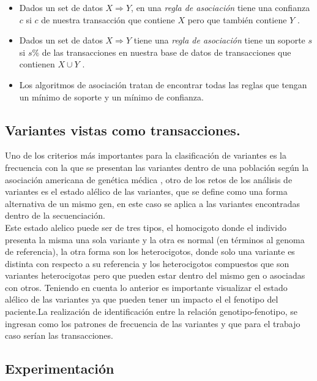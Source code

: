 \begin{itemize}
	\item Dados un set de datos $X \Rightarrow Y$, en una \textit{regla de asociación} tiene una confianza $c$ si $c$ de nuestra transacción que contiene $X$ pero que también contiene $Y$ \cite{Agrawal1994}.
	
	\item Dados un set de datos $X \Rightarrow Y$ tiene una \textit{regla de asociación} tiene un soporte $s$ si $s\%$ de las transacciones en nuestra base de datos de transacciones que contienen $X\cup Y$ \cite{Agrawal1994}. 
	
	\item Los algoritmos de asociación tratan de encontrar todas las reglas que tengan un mínimo de soporte y un mínimo de confianza\cite{Agrawal1994}. 

\end{itemize}

\subsection{Variantes vistas como transacciones.}

Uno de los criterios más importantes para la clasificación de variantes es la frecuencia con la que se presentan las variantes dentro de una población según la asociación americana de genética médica \cite{Laboratories2015}, otro de los retos de los análisis de variantes es el estado alélico de las variantes, que se define como una forma alternativa de un mismo gen, en este caso se aplica a las variantes encontradas dentro de la secuenciación.\\

Este estado alelico puede ser de tres tipos, el homocigoto donde el individo presenta la misma una sola variante y la otra es normal (en términos al genoma de referencia), la otra forma son los heterocigotos, donde solo una variante es distinta con respecto a su referencia y los heterocigotos compuestos que son variantes heterocigotas pero que pueden estar dentro del mismo gen o asociadas con otros. Teniendo en cuenta lo anterior es importante visualizar el estado alélico de las variantes \cite{Laboratories2015.Hannah-Shmouni2015} ya que pueden tener un impacto el el fenotipo del paciente.La realización de identificación entre la relación genotipo-fenotipo,  se ingresan como los patrones de frecuencia de las variantes y que para el trabajo caso serían las transacciones\cite{Breuer2017}.  

\subsection{Experimentación}

